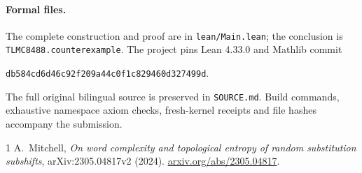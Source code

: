 \documentclass[11pt,a4paper]{article}
\begin{document}
\paragraph{Formal files.}
The complete construction and proof are in \texttt{lean/Main.lean}; the
conclusion is \texttt{TLMC8488.counterexample}. The project pins Lean 4.33.0
and Mathlib commit
\begin{center}
\small\texttt{db584cd6d46c92f209a44c0f1c829460d327499d}.
\end{center}
The full original bilingual source is preserved in \texttt{SOURCE.md}.
Build commands, exhaustive namespace axiom checks, fresh-kernel receipts
and file hashes accompany the submission.

\begin{thebibliography}{1}
A.~Mitchell, \emph{On word complexity and topological entropy of random
substitution subshifts}, arXiv:2305.04817v2 (2024).
\href{https://arxiv.org/abs/2305.04817}{arxiv.org/abs/2305.04817}.
\end{thebibliography}
\end{document}
